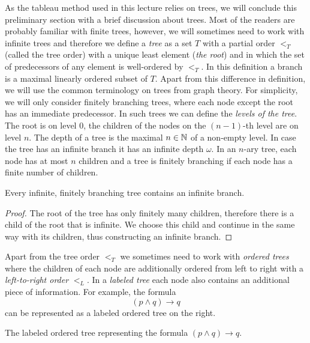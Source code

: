 As the tableau method used in this lecture relies on trees, we will conclude this preliminary section with a brief discussion about trees. Most of the readers are probably familiar with finite trees, however, we will sometimes need to work with infinite trees and therefore we define a \emph{tree} as a set $T$ with a partial order $<_T$ (called the tree order) with a unique least element (\emph{the root}) and in which the set of predecessors of any element is well-ordered by $<_T$. In this definition a branch is a maximal linearly ordered subset of $T$. Apart from this difference in definition, we will use the common terminology on trees from graph theory. For simplicity, we will only consider finitely branching trees, where each node except the root has an immediate predecessor. In such trees we can define the \emph{levels of the tree}. The root is on level 0, the children of the nodes on the $(n-1)$-th level are on level $n$. The depth of a tree is the maximal $n \in \mathbb{N}$ of a non-empty level. In case the tree has an infinite branch it has an infinite depth $\omega$. In an $n$-ary tree, each node has at most $n$ children and a tree is finitely branching if each node has a finite number of children.

\begin{lemma}[König]
Every infinite, finitely branching tree contains an infinite branch.
\end{lemma}
\begin{proof}
The root of the tree has only finitely many children, therefore there is a child of the root that is infinite. We choose this child and continue in the same way with its children, thus constructing an infinite branch.
\end{proof}

Apart from the tree order $<_T$ we sometimes need to work with \emph{ordered trees} where the children of each node are additionally ordered from left to right with a \emph{left-to-right order} $<_L$. In a \emph{labeled tree} each node also contains an additional piece of information. For example, the formula $$(p \land q) \to q$$ can be represented as a labeled ordered tree on the right.

\begin{marginfigure}[-4\baselineskip]
\centering
{}
\caption{The labeled ordered tree representing the formula $(p \land q) \to q$.}
\end{marginfigure}
